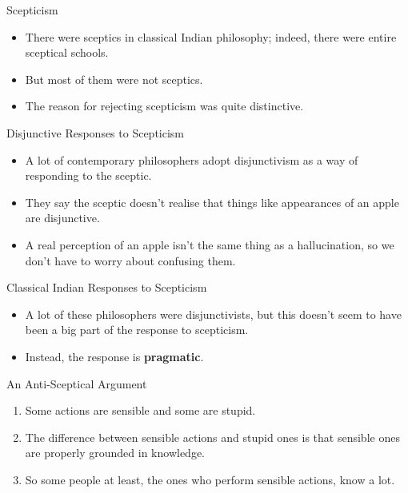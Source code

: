 \documentclass[
  17pt,
  letterpaper,
  ignorenonframetext,
  aspectratio=169,
  handout]{beamer}
\providecommand{\tightlist}{%
  \setlength{\itemsep}{0pt}\setlength{\parskip}{0pt}}\usepackage{longtable,booktabs,array}
\begin{document}
\begin{frame}{Scepticism}
\protect\hypertarget{scepticism-1}{}
\begin{itemize}[<+->]
\tightlist
\item
  There were sceptics in classical Indian philosophy; indeed, there were
  entire sceptical schools.
\item
  But most of them were not sceptics.
\item
  The reason for rejecting scepticism was quite distinctive.
\end{itemize}
\end{frame}

\begin{frame}{Disjunctive Responses to Scepticism}
\protect\hypertarget{disjunctive-responses-to-scepticism}{}
\begin{itemize}[<+->]
\tightlist
\item
  A lot of contemporary philosophers adopt disjunctivism as a way of
  responding to the sceptic.
\item
  They say the sceptic doesn't realise that things like appearances of
  an apple are disjunctive.
\item
  A real perception of an apple isn't the same thing as a hallucination,
  so we don't have to worry about confusing them.
\end{itemize}
\end{frame}

\begin{frame}{Classical Indian Responses to Scepticism}
\protect\hypertarget{classical-indian-responses-to-scepticism}{}
\begin{itemize}[<+->]
\tightlist
\item
  A lot of these philosophers were disjunctivists, but this doesn't seem
  to have been a big part of the response to scepticism.
\item
  Instead, the response is \textbf{pragmatic}.
\end{itemize}
\end{frame}

\begin{frame}{An Anti-Sceptical Argument}
\protect\hypertarget{an-anti-sceptical-argument}{}
\begin{enumerate}[<+->]
\tightlist
\item
  Some actions are sensible and some are stupid.
\item
  The difference between sensible actions and stupid ones is that
  sensible ones are properly grounded in knowledge.
\item
  So some people at least, the ones who perform sensible actions, know a
  lot.
\end{enumerate}
\end{frame}
\end{document}
